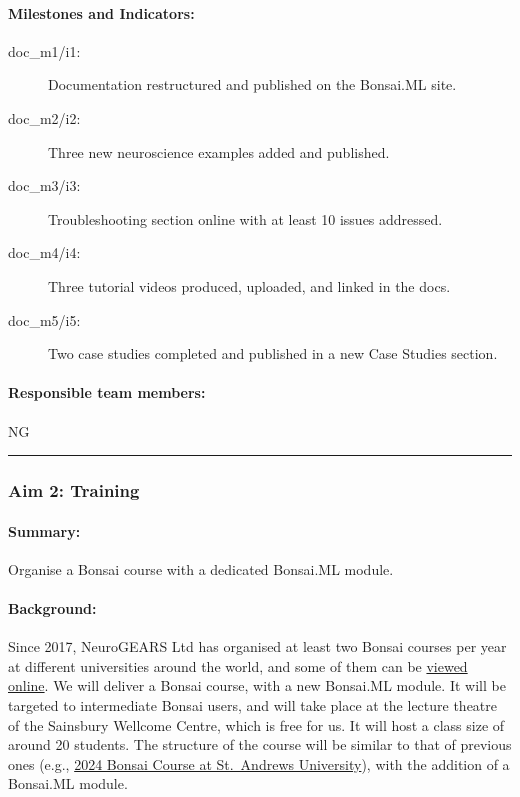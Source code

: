 \paragraph{Milestones and Indicators:}  

\begin{description}
    \item[doc\_m1/i1:] Documentation restructured and published on the Bonsai.ML site.  
    \item[doc\_m2/i2:] Three new neuroscience examples added and published.  
    \item[doc\_m3/i3:] Troubleshooting section online with at least 10 issues addressed.  
    \item[doc\_m4/i4:] Three tutorial videos produced, uploaded, and linked in the docs.  
    \item[doc\_m5/i5:] Two case studies completed and published in a new Case Studies section.  
\end{description}

\paragraph{Responsible team members:} NG

\noindent\rule{\textwidth}{1pt}
\subsubsection{Aim 2: Training}
\paragraph{Summary:} Organise a Bonsai course with a dedicated Bonsai.ML module.

\paragraph{Background:} Since 2017, NeuroGEARS Ltd has organised at least two
Bonsai courses per year at different universities around the world, and some of
them can be \href{https://bonsai-rx.org/learn/}{viewed online}.
%
We will deliver a Bonsai course, with a new Bonsai.ML module. It will be
targeted to intermediate Bonsai users, and will take place at the lecture
theatre of the Sainsbury Wellcome Centre, which is free for us. It will host a
class size of around 20 students. The structure of the course will be similar
to that of previous ones (e.g.,
\href{https://neurogears.org/st-andrews-2024/}{2024 Bonsai Course at
St.~Andrews University}), with the addition of a Bonsai.ML module.

